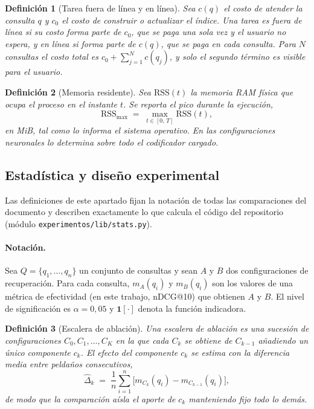 \documentclass[11pt,letterpaper]{article}
\newtheorem{definition}{Definición}[section]
\numberwithin{equation}{section}
\begin{document}
\begin{definition}[Tarea fuera de línea y en línea]
\label{def:linea}
Sea $c(q)$ el costo de atender la consulta $q$ y $c_0$ el costo de construir o actualizar el índice. Una tarea es \emph{fuera de línea} si su costo forma parte de $c_0$, que se paga una sola vez y el usuario no espera, y \emph{en línea} si forma parte de $c(q)$, que se paga en cada consulta. Para $N$ consultas el costo total es $c_0+\sum_{j=1}^{N}c(q_j)$, y solo el segundo término es visible para el usuario.
\end{definition}

\begin{definition}[Memoria residente]
\label{def:rss}
Sea $\mathrm{RSS}(t)$ la memoria RAM física que ocupa el proceso en el instante $t$. Se reporta el pico durante la ejecución,
\begin{equation}
\mathrm{RSS}_{\max} \;=\; \max_{t\in[0,\,T]}\mathrm{RSS}(t),
\label{eq:g-rss}
\end{equation}
en MiB, tal como lo informa el sistema operativo. En las configuraciones neuronales lo determina sobre todo el codificador cargado.
\end{definition}

\subsection*{Estadística y diseño experimental}
\label{sec:glosario-estadistica}
Las definiciones de este apartado fijan la notación de todas las comparaciones del documento y describen exactamente lo que calcula el código del repositorio (módulo \texttt{experimentos/lib/stats.py}).

\paragraph{Notación.} Sea $Q=\{q_1,\dots,q_n\}$ un conjunto de consultas y sean $A$ y $B$ dos configuraciones de recuperación. Para cada consulta, $m_A(q_i)$ y $m_B(q_i)$ son los valores de una métrica de efectividad (en este trabajo, nDCG@10) que obtienen $A$ y $B$. El nivel de significación es $\alpha=0{,}05$ y $\mathbf{1}[\cdot]$ denota la función indicadora.

\begin{definition}[Escalera de ablación]
\label{def:escalera}
Una escalera de ablación es una sucesión de configuraciones $C_0, C_1, \dots, C_K$ en la que cada $C_k$ se obtiene de $C_{k-1}$ añadiendo un único componente $c_k$. El efecto del componente $c_k$ se estima con la diferencia media entre peldaños consecutivos,
\begin{equation}
\widehat{\Delta}_k \;=\; \frac{1}{n}\sum_{i=1}^{n}\big[m_{C_k}(q_i)-m_{C_{k-1}}(q_i)\big],
\label{eq:escalera}
\end{equation}
de modo que la comparación aísla el aporte de $c_k$ manteniendo fijo todo lo demás.
\end{definition}
\end{document}

